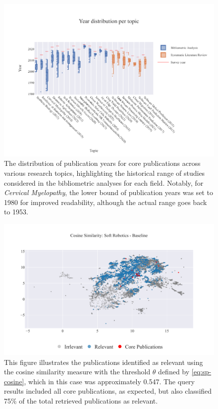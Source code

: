 \documentclass[%
  a4paper,fontsize=11pt,abstract=on,%
  oneside,BCOR=19mm,%
]{scrreprt}
\begin{document}
\begin{figure}
	\centering	
	\includegraphics{pics/year-distribution.pdf}
	\caption[Distribution of publication years per topic]{The distribution of publication years for core publications across various research topics, highlighting the historical range of studies considered in the bibliometric analyses for each field. Notably, for \textit{Cervical Myelopathy}, the lower bound of publication years was set to 1980 for improved readability, although the actual range goes back to 1953.}
	\label{fig:dataset-years}
\end{figure}


\begin{figure}[!h]
	\centering	
	\includegraphics[scale=0.7]{pics/sr-cosine-baseline.pdf}
	\caption[Semantic Cosine Similarity: Soft Robotics]{This figure illustrates the publications identified as relevant using the cosine similarity measure with the threshold $\theta$ defined by \autoref{eq:sp-cosine}, which in this case was approximately 0.547. The query results included all core publications, as expected, but also classified 75\% of the total retrieved publications as relevant.}\label{fig:sr-cosine-baseline}
\end{figure}
\end{document}
